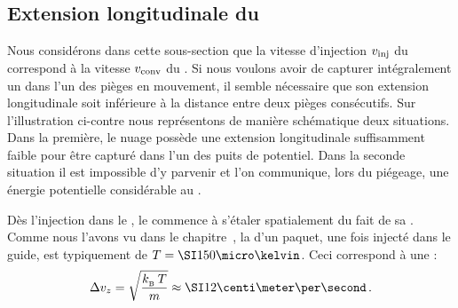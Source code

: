 \subsection{Extension longitudinale du \pat}

{\AjouteLigne}

Nous considérons dans cette sous-section que la vitesse d'injection $v_{{\rm {inj}}}$ du \p correspond à la vitesse ${v_{\rm conv}}$ du \tp.
Si nous voulons avoir  de capturer intégralement un \pat dans l'un des pièges en mouvement, il semble nécessaire que son extension longitudinale soit inférieure à la distance entre deux pièges consécutifs. Sur l'illustration ci-contre nous représentons de manière schématique deux situations. Dans la première, le nuage possède une extension longitudinale suffisamment faible pour être capturé dans l'un des puits de potentiel. Dans la seconde situation il est impossible d'y parvenir et l'on communique, lors du piégeage, une énergie potentielle considérable au \pat.

\casse

Dès l'injection dans le \gm, le \pat commence à s'étaler spatialement du fait de sa \dispvitlong. Comme nous l'avons vu dans le chapitre~, la \templong d'un paquet, une fois injecté dans le guide, est typiquement de $T=\microK{150}$. Ceci correspond à une \dispvitlong :
\begin{equation}
	\deltavjet = \sqrt{\frac{\kb\,T}{m}} \approx \cmps{12}
	\pointformule
	\label{eq:ConvDeltaV}
\end{equation}


